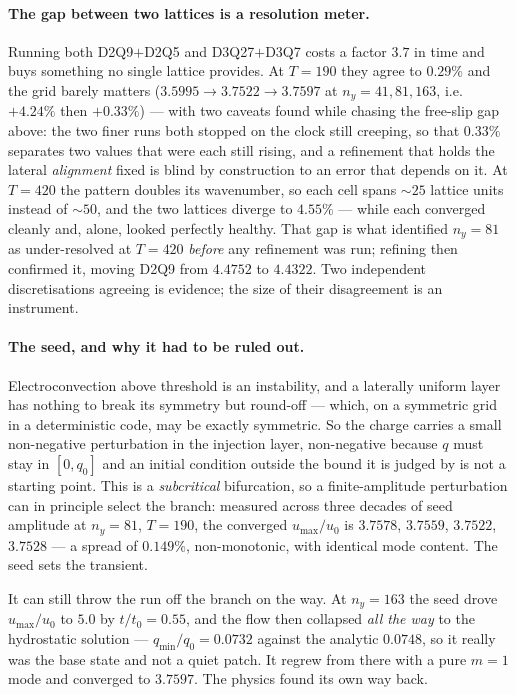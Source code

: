 \documentclass[11pt,a4paper]{article}
\begin{document}
\paragraph{The gap between two lattices is a resolution meter.}
Running both D2Q9$+$D2Q5 and D3Q27$+$D3Q7 costs a factor $3.7$ in time and buys
something no single lattice provides. At $T=190$ they agree to $0.29\%$ and the
grid barely matters ($3.5995\to3.7522\to3.7597$ at $n_y=41,81,163$, i.e.\
$+4.24\%$ then $+0.33\%$) --- with two caveats found while chasing the free-slip
gap above: the two finer runs both stopped on the clock still creeping, so that
$0.33\%$ separates two values that were each still rising, and a refinement that
holds the lateral \emph{alignment} fixed is blind by construction to an error
that depends on it. At
$T=420$ the pattern doubles its wavenumber, so each cell spans $\sim25$ lattice
units instead of $\sim50$, and the two lattices diverge to $4.55\%$ --- while
each converged cleanly and, alone, looked perfectly healthy. That gap is what
identified $n_y=81$ as under-resolved at $T=420$ \emph{before} any refinement was
run; refining then confirmed it, moving D2Q9 from $4.4752$ to $4.4322$. Two
independent discretisations agreeing is evidence; the size of their disagreement
is an instrument.

\paragraph{The seed, and why it had to be ruled out.} Electroconvection above
threshold is an instability, and a laterally uniform layer has nothing to break
its symmetry but round-off --- which, on a symmetric grid in a deterministic
code, may be exactly symmetric. So the charge carries a small non-negative
perturbation in the injection layer, non-negative because $q$ must stay in
$[0,q_0]$ and an initial condition outside the bound it is judged by is not a
starting point. This is a \emph{subcritical} bifurcation, so a finite-amplitude
perturbation can in principle select the branch: measured across three decades of
seed amplitude at $n_y=81$, $T=190$, the converged $u_{\max}/u_0$ is $3.7578$,
$3.7559$, $3.7522$, $3.7528$ --- a spread of $0.149\%$, non-monotonic, with
identical mode content. The seed sets the transient.

It can still throw the run off the branch on the way. At $n_y=163$ the seed drove
$u_{\max}/u_0$ to $5.0$ by $t/t_0=0.55$, and the flow then collapsed \emph{all
the way} to the hydrostatic solution --- $q_{\min}/q_0=0.0732$ against the
analytic $0.0748$, so it really was the base state and not a quiet patch. It
regrew from there with a pure $m=1$ mode and converged to $3.7597$. The physics
found its own way back.
\end{document}
